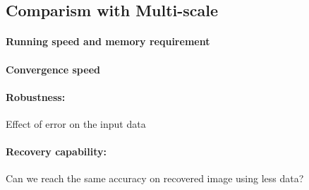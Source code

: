 \subsection{Comparism with Multi-scale}
\paragraph{Running speed and memory requirement}
\paragraph{Convergence speed}
\paragraph{Robustness:} Effect of error on the input data
\paragraph{Recovery capability:} Can we reach the same accuracy on recovered image using less data?

\clearpage %